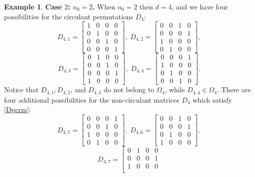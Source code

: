 \documentclass{article}
\theoremstyle{definition}\newtheorem{example}{Example}[section]
\begin{document}
\begin{example}
		\noindent\textbf{Case $2$: $n_0=2$.} When $n_0=2$ then $d=4$, and we have four possibilities for the circulant permutations $D_4$:
		$$D_{4,1}=\left[\begin{array}{cccc}
			1 & 0 & 0 & 0\\
			0 & 1 & 0 & 0\\
			0 & 0 & 1 & 0\\
			0 & 0 & 0 & 1
		\end{array}\right],\;D_{4,2}=\left[\begin{array}{cccc}
			0 & 0 & 1 & 0\\
			0 & 0 & 0 & 1\\
			1 & 0 & 0 & 0\\
			0 & 1 & 0 & 0
		\end{array}\right],$$
		$$D_{4,3}=\left[\begin{array}{cccc}
			0 & 1 & 0 & 0\\
			0 & 0 & 1 & 0\\
			0 & 0 & 0 & 1\\
			1 & 0 & 0 & 0
		\end{array}\right],\;
		D_{4,4}=\left[\begin{array}{cccc}
			0 & 0 & 0 & 1\\
			1 & 0 & 0 & 0\\
			0 & 1 & 0 & 0\\
			0 & 0 & 1 & 0
		\end{array}\right].$$
		Notice that $D_{4,1},D_{4,2}$, and $D_{4,3}$ do not belong to $\Omega_4$, while $D_{4,4}\in\Omega_4$. There are four additional possibilities for the non-circulant matrices $D_4$ which satisfy \eqref{Dperm}:
		$$D_{4,5}=\left[\begin{array}{cccc}
			0 & 0 & 0 & 1\\
			0 & 0 & 1 & 0\\
			1 & 0 & 0 & 0\\
			0 & 1 & 0 & 0
		\end{array}\right],\;D_{4,6}=\left[\begin{array}{cccc}
			0 & 0 & 1 & 0\\
			0 & 0 & 0 & 1\\
			0 & 1 & 0 & 0\\
			1 & 0 & 0 & 0
		\end{array}\right],$$
		$$D_{4,7}=\left[\begin{array}{cccc}
			0 & 1 & 0 & 0\\
			0 & 0 & 0 & 1\\
			1 & 0 & 0 & 0\\

\end{array}$$
\end{example}
\end{document}
